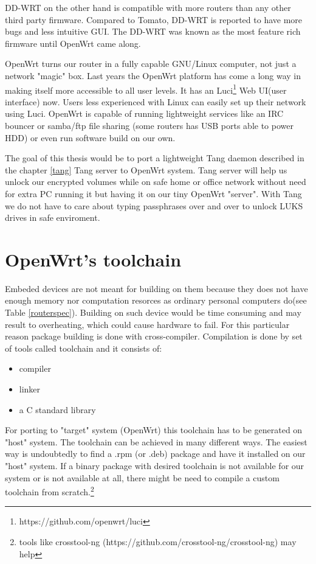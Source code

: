 DD-WRT on the other hand is compatible with more routers than any other third party firmware.
Compared to Tomato, DD-WRT is reported to have more bugs and less intuitive GUI.
The DD-WRT was known as the most feature rich firmware until OpenWrt came along.

OpenWrt turns our router in a fully capable GNU/Linux computer, not just a network "magic" box.
Last years the OpenWrt platform has come a long way in making itself more accessible to all user levels.
It has an Luci\footnote{https://github.com/openwrt/luci} Web UI(user interface) now.
Users less experienced with Linux can easily set up their network using Luci.
OpenWrt is capable of running lightweight services like an IRC bouncer or samba/ftp file sharing (some routers has USB ports able to power HDD) or even run software build on our own\cite{vpnpick}.

The goal of this thesis would be to port a lightweight Tang daemon described in the chapter \ref{tang} Tang server to OpenWrt system.
Tang server will help us unlock our encrypted volumes while on safe home or office network without need for extra PC running it but having it on our tiny OpenWrt "server".
With Tang we do not have to care about typing passphrases over and over to unlock LUKS drives in safe enviroment.

\section{OpenWrt's toolchain}

Embeded devices are not meant for building on them because they does not have enough memory nor computation resorces as ordinary personal computers do(see Table \ref{routerspec}).
Building on such device would be time consuming and may result to overheating, which could cause hardware to fail.
For this particular reason package building is done with cross-compiler.
Compilation is done by set of tools called toolchain and it consists of:
\begin{itemize}
    \item compiler
    \item linker
    \item a C standard library
\end{itemize}
For porting to "target" system (OpenWrt) this toolchain has to be generated on "host" system.
The toolchain can be achieved in many different ways.
The easiest way is undoubtedly to find a .rpm (or .deb) package and have it installed on our "host" system.
If a binary package with desired toolchain is not available for our system or is not available at all, there might be need to compile a custom toolchain from scratch.\footnote{tools like crosstool-ng (https://github.com/crosstool-ng/crosstool-ng) may help}

